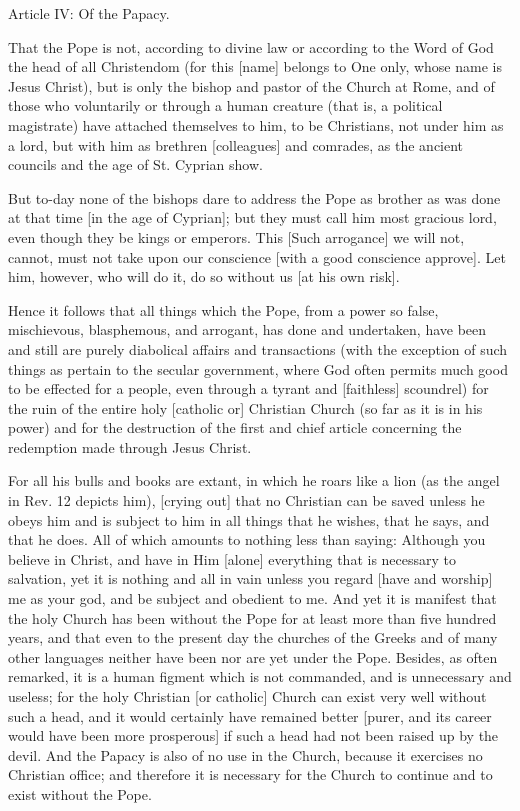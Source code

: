Article IV: Of the Papacy.

That the Pope is not, according to divine law or according to
the Word of God the head of all Christendom (for this [name]
belongs to One only, whose name is Jesus Christ), but is only
the bishop and pastor of the Church at Rome, and of those who
voluntarily or through a human creature (that is, a political
magistrate) have attached themselves to him, to be Christians,
not under him as a lord, but with him as brethren [colleagues]
and comrades, as the ancient councils and the age of St.
Cyprian show.

But to-day none of the bishops dare to address the Pope as
brother as was done at that time [in the age of Cyprian]; but
they must call him most gracious lord, even though they be
kings or emperors. This [Such arrogance] we will not, cannot,
must not take upon our conscience [with a good conscience
approve]. Let him, however, who will do it, do so without us
[at his own risk].

Hence it follows that all things which the Pope, from a power
so false, mischievous, blasphemous, and arrogant, has done and
undertaken, have been and still are purely diabolical affairs
and transactions (with the exception of such things as pertain
to the secular government, where God often permits much good
to be effected for a people, even through a tyrant and
[faithless] scoundrel) for the ruin of the entire holy
[catholic or] Christian Church (so far as it is in his power)
and for the destruction of the first and chief article
concerning the redemption made through Jesus Christ.

For all his bulls and books are extant, in which he roars like
a lion (as the angel in Rev. 12 depicts him), [crying out] that
no Christian can be saved unless he obeys him and is subject
to him in all things that he wishes, that he says, and that he
does. All of which amounts to nothing less than saying:
Although you believe in Christ, and have in Him [alone]
everything that is necessary to salvation, yet it is nothing
and all in vain unless you regard [have and worship] me as
your god, and be subject and obedient to me. And yet it is
manifest that the holy Church has been without the Pope for at
least more than five hundred years, and that even to the
present day the churches of the Greeks and of many other
languages neither have been nor are yet under the Pope.
Besides, as often remarked, it is a human figment which is not
commanded, and is unnecessary and useless; for the holy
Christian [or catholic] Church can exist very well without
such a head, and it would certainly have remained better
[purer, and its career would have been more prosperous] if
such a head had not been raised up by the devil. And the
Papacy is also of no use in the Church, because it exercises
no Christian office; and therefore it is necessary for the
Church to continue and to exist without the Pope.

